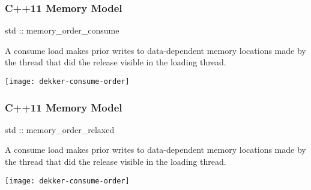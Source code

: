 \begin{frame}
    \frametitle{C++11 Memory Model}
    \LARGE
    std :: memory\_order\_consume
    
    
    \normalsize
    A consume load makes prior writes to data-dependent memory
    locations made by the thread that did the release visible in the
    loading thread.
    
    
    
    \texttt{[image: dekker-consume-order]}
\end{frame}


\begin{frame}
    \frametitle{C++11 Memory Model}
    \LARGE
    std :: memory\_order\_relaxed
    
    
    \normalsize
    A consume load makes prior writes to data-dependent memory
    locations made by the thread that did the release visible in the
    loading thread.
    
    
    
    \texttt{[image: dekker-consume-order]}
\end{frame}


